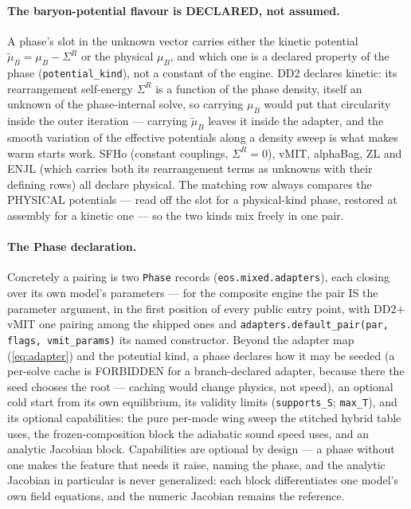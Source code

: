 \documentclass[aps,prc,onecolumn,superscriptaddress,nofootinbib,10pt]{revtex4-2}
\newcommand{\muB}{\mu_B}
\newcommand{\mutB}{\tilde\mu_B}
\begin{document}
\paragraph{The baryon-potential flavour is DECLARED, not assumed.} A phase's
slot in the unknown vector carries either the kinetic potential
$\mutB = \muB - \Sigma^R$ or the physical $\muB$, and which one is a declared
property of the phase (\texttt{potential\_kind}), not a constant of the
engine. DD2 declares kinetic: its rearrangement self-energy $\Sigma^R$ is a
function of the phase density, itself an unknown of the phase-internal solve,
so carrying $\muB$ would put that circularity inside the outer iteration ---
carrying $\mutB$ leaves it inside the adapter, and the smooth variation of
the effective potentials along a density sweep is what makes warm starts
work. SFHo (constant couplings, $\Sigma^R = 0$), vMIT, alphaBag, ZL and ENJL
(which carries both its rearrangement terms as unknowns with their defining
rows) all declare physical. The matching row always compares the PHYSICAL
potentials --- read off the slot for a physical-kind phase, restored at
assembly for a kinetic one --- so the two kinds mix freely in one pair.

\paragraph{The Phase declaration.} Concretely a pairing is two \texttt{Phase}
records (\texttt{eos.mixed.adapters}), each closing over its own model's
parameters --- for the composite engine the pair IS the parameter argument, in
the first position of every public entry point, with DD2$+$vMIT one pairing
among the shipped ones and
\texttt{adapters.default\_pair(par, flags, vmit\_params)} its named
constructor. Beyond the adapter map (\ref{eq:adapter}) and the potential kind, a phase
declares how it may be seeded (a per-solve cache is FORBIDDEN for a
branch-declared adapter, because there the seed chooses the root --- caching
would change physics, not speed), an optional cold start from its own
equilibrium, its validity limits (\texttt{supports\_S}; \texttt{max\_T}), and
its optional capabilities: the pure per-mode wing sweep the stitched hybrid
table uses, the frozen-composition block the adiabatic sound speed uses, and
an analytic Jacobian block. Capabilities are optional by design --- a phase
without one makes the feature that needs it raise, naming the phase, and the
analytic Jacobian in particular is never generalized: each block
differentiates one model's own field equations, and the numeric Jacobian
remains the reference.
\end{document}
